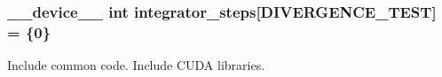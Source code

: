 \subsubsection[{\texorpdfstring{integrator\+\_\+steps}{integrator_steps}}]{\setlength{\rightskip}{0pt plus 5cm}\+\_\+\+\_\+device\+\_\+\+\_\+ int integrator\+\_\+steps\mbox{[}{\bf D\+I\+V\+E\+R\+G\+E\+N\+C\+E\+\_\+\+T\+E\+ST}\mbox{]} = \{0\}}\hypertarget{solver__main_8cu_a67cdbf6535bef9d8f0227e8340e7fe0a}{}\label{solver__main_8cu_a67cdbf6535bef9d8f0227e8340e7fe0a}
Include common code. Include C\+U\+DA libraries. 